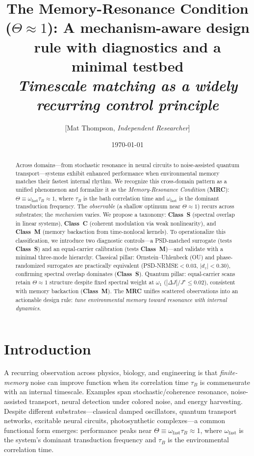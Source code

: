 \documentclass[11pt,letterpaper]{article}
\title{\bfseries\Large
The Memory-Resonance Condition ($\Theta\!\approx\!1$): A mechanism-aware design rule with diagnostics and a minimal testbed\\[0.35em]
\itshape\normalsize
Timescale matching as a widely recurring control principle}
\author{[Mat Thompson, \emph{Independent Researcher}]}
\date{\today}
\DeclareRobustCommand{\mrc}{\textbf{MRC}\xspace}
\DeclareRobustCommand{\classS}{\textbf{Class~S}\xspace}
\DeclareRobustCommand{\classC}{\textbf{Class~C}\xspace}
\DeclareRobustCommand{\classM}{\textbf{Class~M}\xspace}
\begin{document}
\maketitle

\begin{abstract}
Across domains---from stochastic resonance in neural circuits to noise-assisted quantum transport---systems exhibit enhanced performance when environmental memory matches their fastest internal rhythm. We recognize this cross-domain pattern as a unified phenomenon and formalize it as the \emph{Memory-Resonance Condition} (\mrc): $\Theta \equiv \omega_{\mathrm{fast}}\tau_B \approx 1$, where $\tau_B$ is the bath correlation time and $\omega_{\mathrm{fast}}$ is the dominant transduction frequency. The \emph{observable} (a shallow optimum near $\Theta\!\approx\!1$) recurs across substrates; the \emph{mechanism} varies. We propose a taxonomy: \classS{} (spectral overlap in linear systems), \classC{} (coherent modulation via weak nonlinearity), and \classM{} (memory backaction from time-nonlocal kernels). To operationalize this classification, we introduce two diagnostic controls---a PSD-matched surrogate (tests \classS) and an equal-carrier calibration (tests \classM)---and validate with a minimal three-mode hierarchy. Classical pillar: Ornstein--Uhlenbeck (OU) and phase-randomized surrogates are practically equivalent (PSD-NRMSE$<$0.03, $|d_z|<$0.30), confirming spectral overlap dominates (\classS). Quantum pillar: equal-carrier scans retain $\Theta\!\approx\!1$ structure despite fixed spectral weight at $\omega_1$ ($|\Delta J|/J^\star\!\le\!0.02$), consistent with memory backaction (\classM). The \mrc unifies scattered observations into an actionable design rule: \emph{tune environmental memory toward resonance with internal dynamics}.
\end{abstract}

\section{Introduction}
A recurring observation across physics, biology, and engineering is that \emph{finite-memory} noise can improve function when its correlation time $\tau_B$ is commensurate with an internal timescale. Examples span stochastic/coherence resonance, noise-assisted transport, neural detection under colored noise, and energy harvesting. Despite different substrates---classical damped oscillators, quantum transport networks, excitable neural circuits, photosynthetic complexes---a common functional form emerges: performance peaks near $\Theta\equiv\omega_{\mathrm{fast}}\tau_B\approx 1$, where $\omega_{\mathrm{fast}}$ is the system's dominant transduction frequency and $\tau_B$ is the environmental correlation time.
\end{document}
